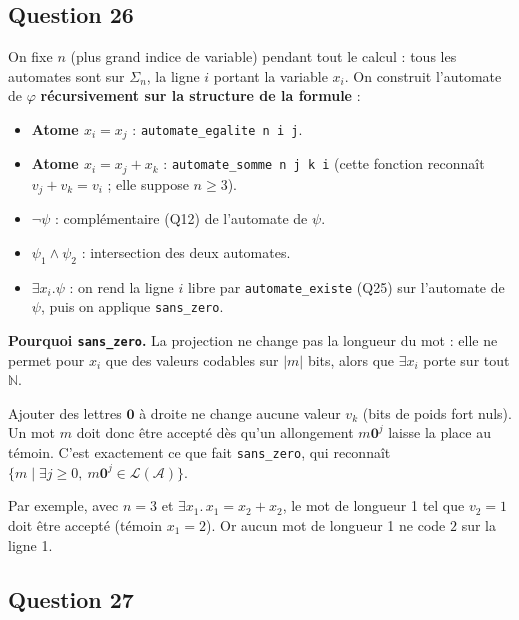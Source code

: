 \documentclass[11pt,a4paper]{article}
\providecommand{\tightlist}{\setlength{\itemsep}{0pt}\setlength{\parskip}{0pt}}
\begin{document}
\hypertarget{question-26}{%
\subsection{Question 26}\label{question-26}}

On fixe \(n\) (plus grand indice de variable) pendant tout le calcul : tous les automates sont sur \(\Sigma_n\), la ligne \(i\) portant la variable \(x_i\). On construit l'automate de \(\varphi\) \textbf{récursivement sur la structure de la formule} :

\begin{itemize}
\tightlist
\item
  \textbf{Atome \(x_i=x_j\)} : \texttt{automate\_egalite\ n\ i\ j}.
\item
  \textbf{Atome \(x_i=x_j+x_k\)} : \texttt{automate\_somme\ n\ j\ k\ i} (cette fonction reconnaît \(v_j+v_k=v_i\) ; elle suppose \(n\ge3\)).
\item
  \textbf{\(\neg\psi\)} : complémentaire (Q12) de l'automate de \(\psi\).
\item
  \textbf{\(\psi_1\wedge\psi_2\)} : intersection des deux automates.
\item
  \textbf{\(\exists x_i.\psi\)} : on rend la ligne \(i\) libre par \texttt{automate\_existe} (Q25) sur l'automate de \(\psi\), puis on applique \texttt{sans\_zero}.
\end{itemize}

\textbf{Pourquoi \texttt{sans\_zero}.} La projection ne change pas la longueur du mot : elle ne permet pour \(x_i\) que des valeurs codables sur \(|m|\) bits, alors que \(\exists x_i\) porte sur tout \(\mathbb{N}\).

Ajouter des lettres \(\mathbf{0}\) à droite ne change aucune valeur \(v_k\) (bits de poids fort nuls). Un mot \(m\) doit donc être accepté dès qu'un allongement \(m{\mathbf{0}}^j\) laisse la place au témoin. C'est exactement ce que fait \texttt{sans\_zero}, qui reconnaît \(\{m\mid\exists j\ge0,\allowbreak \ m{\mathbf{0}}^j\in\mathcal{L}(\mathcal{A})\}\).

Par exemple, avec \(n=3\) et \(\exists x_1.\,x_1=x_2+x_2\), le mot de longueur 1 tel que \(v_2=1\) doit être accepté (témoin \(x_1=2\)). Or aucun mot de longueur 1 ne code \(2\) sur la ligne 1.

\hypertarget{question-27}{%
\subsection{Question 27}\label{question-27}}
\end{document}
